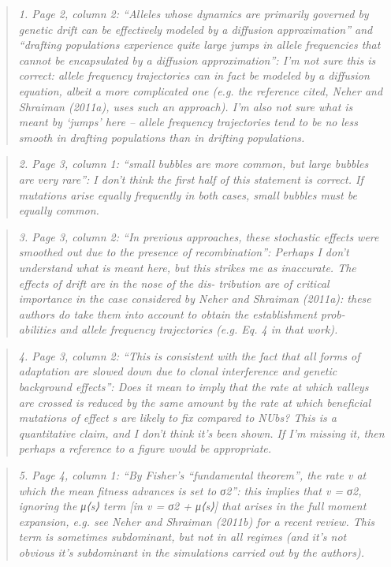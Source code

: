 \documentclass[11pt]{article}
\newenvironment{reviewerquote}{\begin{quote}\color{black}\itshape}{\end{quote}}
\begin{document}
\begin{reviewerquote}
1. Page 2, column 2: “Alleles whose dynamics are primarily governed by genetic drift can be effectively modeled by a diffusion approximation” and “drafting populations experience quite large jumps in allele frequencies that cannot be encapsulated by a diffusion approximation”: I’m not sure this is correct: allele frequency trajectories can in fact be modeled by a diffusion equation, albeit a more complicated one (e.g. the reference cited, Neher and Shraiman (2011a), uses such an approach). I’m also not sure what is meant by ‘jumps’ here – allele frequency trajectories tend to be no less smooth in drafting populations than in drifting populations.
\end{reviewerquote}


\begin{reviewerquote}
2. Page 3, column 1: “small bubbles are more common, but large bubbles are very rare”: I don’t think the first half of this statement is correct. If mutations arise equally frequently in both cases, small bubbles must be equally common.
\end{reviewerquote}


\begin{reviewerquote}
3. Page 3, column 2: “In previous approaches, these stochastic effects were smoothed out due to the presence of recombination”: Perhaps I don’t understand what is meant here, but this strikes me as inaccurate. The effects of drift are in the nose of the dis- tribution are of critical importance in the case considered by Neher and Shraiman (2011a): these authors do take them into account to obtain the establishment prob- abilities and allele frequency trajectories (e.g. Eq. 4 in that work).
\end{reviewerquote}


\begin{reviewerquote}
4. Page 3, column 2: “This is consistent with the fact that all forms of adaptation are slowed down due to clonal interference and genetic background effects”: Does it mean to imply that the rate at which valleys are crossed is reduced by the same amount by the rate at which beneficial mutations of effect s are likely to fix compared to NUbs? This is a quantitative claim, and I don’t think it’s been shown. If I’m missing it, then perhaps a reference to a figure would be appropriate.
\end{reviewerquote}


\begin{reviewerquote}
5. Page 4, column 1: “By Fisher’s “fundamental theorem”, the rate v at which the mean fitness advances is set to σ2”: this implies that v = σ2, ignoring the μ⟨s⟩ term [in v = σ2 + μ⟨s⟩] that arises in the full moment expansion, e.g. see Neher and Shraiman (2011b) for a recent review. This term is sometimes subdominant, but not in all regimes (and it’s not obvious it’s subdominant in the simulations carried out by the authors).
\end{reviewerquote}
\end{document}
